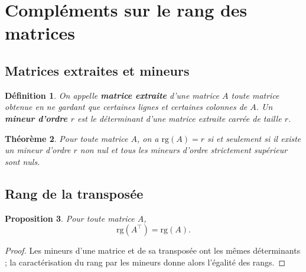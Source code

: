 \documentclass[11pt,a4paper]{article}
\newtheorem{definition}{Définition}[section]
\newtheorem{theoreme}[definition]{Théorème}
\newtheorem{proposition}[definition]{Proposition}
\theoremstyle{remark}
\newcommand{\rg}{\mathrm{rg}}
\begin{document}
\section{Compléments sur le rang des matrices}

\subsection{Matrices extraites et mineurs}

\begin{definition}
On appelle \textbf{matrice extraite} d’une matrice \(A\) toute matrice obtenue en ne gardant que certaines lignes et certaines colonnes de \(A\).
Un \textbf{mineur d’ordre \(r\)} est le déterminant d’une matrice extraite carrée de taille \(r\).
\end{definition}

\begin{theoreme}
Pour toute matrice \(A\), on a \(\rg(A)=r\) si et seulement si il existe un mineur d’ordre \(r\) non nul et tous les mineurs d’ordre strictement supérieur sont nuls.
\end{theoreme}

\subsection{Rang de la transposée}

\begin{proposition}
Pour toute matrice \(A\),
\[
\rg(A^\top)=\rg(A).
\]
\end{proposition}

\begin{proof}
Les mineurs d’une matrice et de sa transposée ont les mêmes déterminants ; la caractérisation du rang par les mineurs donne alors l’égalité des rangs.
\end{proof}
\end{document}
